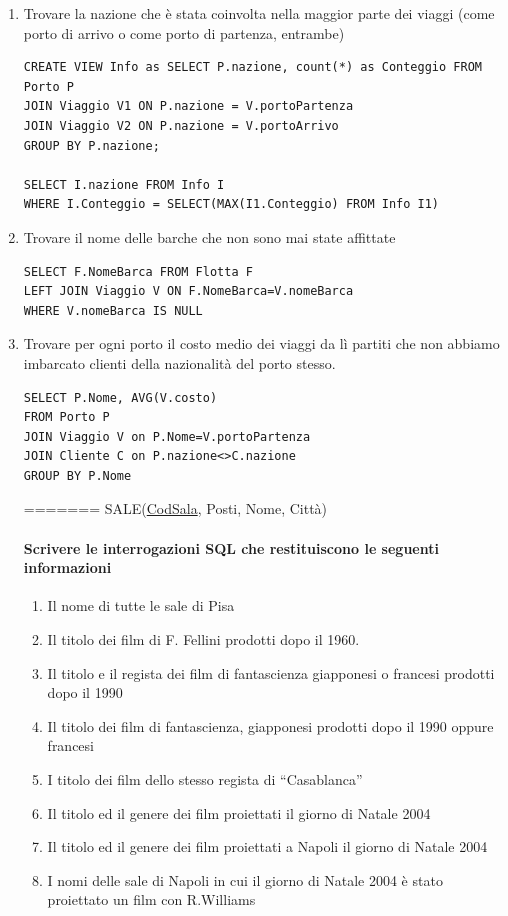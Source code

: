 \documentclass[a4paper]{article}
\begin{document}
\begin{enumerate}[leftmargin=*]
\item Trovare la nazione che è stata coinvolta nella maggior parte dei viaggi (come porto di arrivo o come porto di partenza, entrambe)
\begin{verbatim}
CREATE VIEW Info as SELECT P.nazione, count(*) as Conteggio FROM Porto P
JOIN Viaggio V1 ON P.nazione = V.portoPartenza
JOIN Viaggio V2 ON P.nazione = V.portoArrivo
GROUP BY P.nazione;

SELECT I.nazione FROM Info I
WHERE I.Conteggio = SELECT(MAX(I1.Conteggio) FROM Info I1)
\end{verbatim}
\item Trovare il nome delle barche che non sono mai state affittate
\begin{verbatim}
SELECT F.NomeBarca FROM Flotta F
LEFT JOIN Viaggio V ON F.NomeBarca=V.nomeBarca
WHERE V.nomeBarca IS NULL
\end{verbatim}
\item Trovare per ogni porto il costo medio dei viaggi da lì partiti che non abbiamo imbarcato clienti della nazionalità del porto stesso.
\begin{verbatim}
SELECT P.Nome, AVG(V.costo)
FROM Porto P
JOIN Viaggio V on P.Nome=V.portoPartenza
JOIN Cliente C on P.nazione<>C.nazione
GROUP BY P.Nome
\end{verbatim}
=======
SALE(\underline{CodSala}, Posti, Nome, Città)
%
\paragraph{Scrivere le interrogazioni SQL che restituiscono le seguenti informazioni}
\begin{enumerate}
\item Il nome di tutte le sale di Pisa
\item Il titolo dei film di F. Fellini prodotti dopo il 1960.
\item Il titolo e il regista dei film di fantascienza giapponesi o francesi prodotti dopo il 1990
\item Il titolo dei film di fantascienza, giapponesi prodotti dopo il 1990 oppure francesi
\item I titolo dei film dello stesso regista di “Casablanca”
\item Il titolo ed  il genere dei film proiettati il giorno di Natale 2004
\item  Il titolo ed  il genere dei film proiettati a Napoli il giorno di Natale 2004
\item  I nomi delle sale di Napoli in cui  il giorno di Natale 2004 è stato proiettato un film con R.Williams
\end{enumerate}


\end{enumerate}
\end{document}
